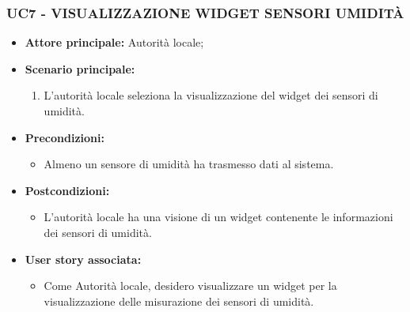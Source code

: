 \subsubsection{UC7 - VISUALIZZAZIONE WIDGET SENSORI UMIDITÀ}
\begin{itemize}
    \item \textbf{Attore principale:} Autorità locale;
    \item \textbf{Scenario principale:}
          \begin{enumerate}
              \item L'autorità locale seleziona la visualizzazione del widget dei sensori di umidità.
          \end{enumerate}
    \item \textbf{Precondizioni:}
          \begin{itemize}
              \item  Almeno un sensore di umidità ha trasmesso dati al sistema.
          \end{itemize}
    \item \textbf{Postcondizioni:}
          \begin{itemize}
              \item  L'autorità locale ha una visione di un widget contenente le informazioni dei sensori di umidità.
          \end{itemize}
    \item \textbf{User story associata:}
          \begin{itemize}
              \item Come Autorità locale, desidero visualizzare un widget per la visualizzazione delle misurazione dei sensori di umidità.
          \end{itemize}
\end{itemize}